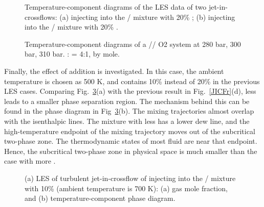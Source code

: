 \begin{figure}[htb]
    \centering
    \caption{Temperature-component diagrams of the LES data of two jet-in-crossflows: (a) injecting  into the / mixture with 20\% ; (b) injecting  into the / mixture with 20\% .}
    \label{JICFT}
\end{figure}

\begin{figure}[htb]
    \centering
    \caption{Temperature-component diagrams of a //\ce
    {O2} system at 280 bar, 300 bar, 310 bar. : = 4:1, by mole.}
    \label{JICFTX}
\end{figure}

Finally, the effect of  addition is investigated. In this case, the ambient temperature is chosen as 500 K, and  contains 10\%  instead of 20\% in the previous LES cases. Comparing Fig.~\ref{JICFH}(a) with the previous result in Fig.~\ref{JICFr}(d), less  leads to a smaller phase separation region. The mechanism behind this can be found in the phase diagram in Fig~\ref{JICFH}(b). The mixing trajectories almost overlap with the isenthalpic lines. The mixture  with less  has a lower dew line, and the high-temperature endpoint of the mixing trajectory moves out of the subcritical two-phase zone. The thermodynamic states of most fluid are near that endpoint. Hence, the subcritical two-phase zone in physical space is much smaller than the case with more .
\begin{figure}[htb]
    \centering
    \caption{(a) LES of turbulent jet-in-crossflow of injecting  into the / mixture with 10\%  (ambient temperature is 700 K): (a) gas mole fraction, and (b) temperature-component phase diagram.}
    \label{JICFH}
\end{figure}

